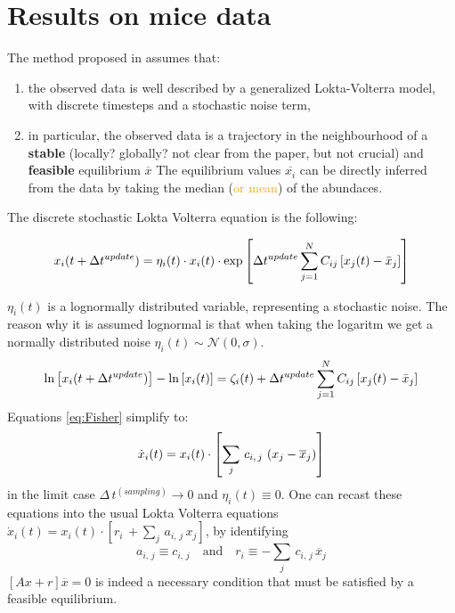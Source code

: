 \section{Results on mice data}

The method proposed in \parencite{fisher} assumes that:
\begin{enumerate}
\item the observed data is well described by a generalized Lokta-Volterra model, with discrete timesteps and a stochastic noise term,
\item in particular, the observed data is a trajectory in the neighbourhood of a \textbf{stable} (locally? globally? not clear from the paper, but not crucial) and \textbf{feasible} equilibrium $\overline{x}$ The equilibrium values $\overline{x_i}$ can be directly inferred from the data by taking the median (\textcolor{orange}{or mean}) of the abundaces.
\end{enumerate}

The discrete stochastic Lokta Volterra equation is the following:

\begin{equation}
\label{eq:Fisher}
x_i(t + \Delta t^{\small update}) = \eta_i(t) \cdot x_i(t) \cdot \exp \left[ \Delta t^{\small update} \sum_{j=1}^{N} C_{ij} \left[ x_j(t) - \bar{x}_j \right] \right]
\end{equation}

$\eta_i(t)$ is a lognormally distributed variable, representing a stochastic noise. The reason why it is assumed lognormal is that when taking the logaritm we get a normally distributed noise $\eta_i(t) \sim \mathcal{N}(0, \sigma).$ \\
\newline
\begin{equation}
\ln\left[x_i(t + \Delta t^{\small update})\right] - \ln\left[x_i(t)\right] = \zeta_i(t) + \Delta t^{\small update} \sum_{j=1}^{N} C_{ij} \left[ x_j(t) - \bar{x}_j \right]
\end{equation}
Equations \ref{eq:Fisher} simplify to:
\begin{equation*}
    \centering
     \dot{x}_i(t) = x_i(t)\cdot \left[\sum_j\, c_{i,\,j}\, \left(x_j- \overline{x}_j\right)\right]
\end{equation*}
in the limit case $\Delta\, t^{(sampling)}\rightarrow 0$ and $\eta_i(t) \equiv 0$. One can recast these equations into the usual Lokta Volterra equations $ \dot{x}_i(t) = x_i(t)\cdot \left[ r_i\, + \sum_j\, a_{i,\,j}\, x_j \right]$, by identifying
\begin{equation*}
     a_{i,\,j} \equiv c_{i,\,j} \quad \text{and} \quad r_i \equiv - \sum_j\, c_{i,\,j}\,\overline{x}_j
\end{equation*}
$[Ax + r]\overline{x} = 0$ is indeed a necessary condition that must be satisfied by  a feasible equilibrium.





